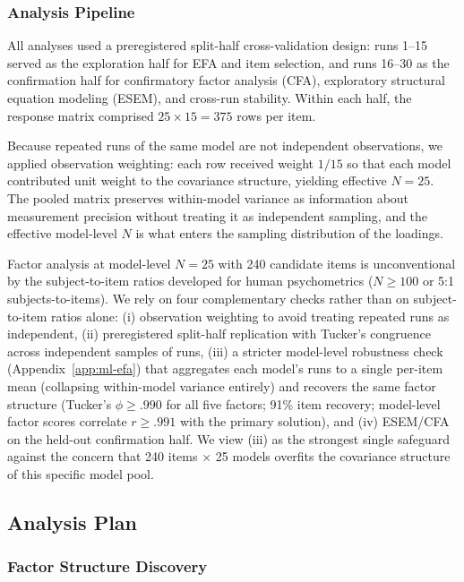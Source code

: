 \documentclass[11pt]{article}
\newcommand{\nmodels}{25}
\begin{document}
\subsubsection{Analysis Pipeline}
\label{sec:analysis-pipeline}

All analyses used a preregistered split-half cross-validation design: runs 1--15 served as the exploration half for EFA and item selection, and runs 16--30 as the confirmation half for confirmatory factor analysis (CFA), exploratory structural equation modeling (ESEM), and cross-run stability.
Within each half, the response matrix comprised $\nmodels{} \times 15 = 375$ rows per item.

Because repeated runs of the same model are not independent observations, we applied observation weighting: each row received weight $1/15$ so that each model contributed unit weight to the covariance structure, yielding effective $N = 25$. The pooled matrix preserves within-model variance as information about measurement precision without treating it as independent sampling, and the effective model-level $N$ is what enters the sampling distribution of the loadings.

Factor analysis at model-level $N = 25$ with 240 candidate items is unconventional by the subject-to-item ratios developed for human psychometrics ($N \geq 100$ or 5:1 subjects-to-items). We rely on four complementary checks rather than on subject-to-item ratios alone: (i) observation weighting to avoid treating repeated runs as independent, (ii) preregistered split-half replication with Tucker's congruence across independent samples of runs, (iii) a stricter model-level robustness check (Appendix~\ref{app:ml-efa}) that aggregates each model's runs to a single per-item mean (collapsing within-model variance entirely) and recovers the same factor structure (Tucker's $\phi \geq .990$ for all five factors; 91\% item recovery; model-level factor scores correlate $r \geq .991$ with the primary solution), and (iv) ESEM/CFA on the held-out confirmation half. We view (iii) as the strongest single safeguard against the concern that 240 items $\times$ 25 models overfits the covariance structure of this specific model pool.


\subsection{Analysis Plan}
\label{sec:analysis-plan}

\subsubsection{Factor Structure Discovery}
\label{sec:efa-plan}
\end{document}
